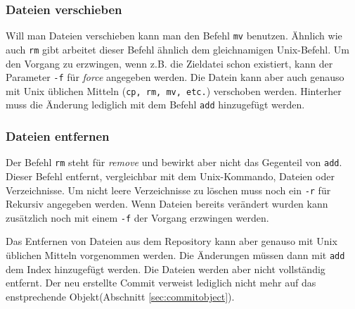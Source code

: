 \subsubsection{Dateien verschieben} Will man Dateien verschieben kann man den Befehl
\texttt{mv} benutzen. Ähnlich wie auch \texttt{rm} gibt arbeitet dieser Befehl
ähnlich dem gleichnamigen Unix-Befehl. Um den Vorgang zu erzwingen, wenn z.B.
die Zieldatei schon existiert, kann der Parameter \texttt{-f} für
\textit{force} angegeben werden.  Die Datein kann aber auch genauso mit Unix
üblichen Mitteln (\texttt{cp, rm, mv, etc.}) verschoben werden. Hinterher muss
die Änderung lediglich mit dem Befehl \texttt{add} hinzugefügt
werden.\cite[S.~43-44]{gitosp}



\subsubsection{Dateien entfernen}
Der Befehl \texttt{rm} steht für \textit{remove} und bewirkt aber nicht das
Gegenteil von \texttt{add}. Dieser Befehl entfernt, vergleichbar mit dem
Unix-Kommando, Dateien oder Verzeichnisse. Um nicht leere Verzeichnisse zu
löschen muss noch ein \texttt{-r} für Rekursiv angegeben werden. Wenn Dateien
bereits verändert wurden kann zusätzlich noch mit einem \texttt{-f} der Vorgang
erzwingen werden.



Das Entfernen von Dateien aus dem Repository kann aber genauso mit Unix
üblichen Mitteln vorgenommen werden. Die Änderungen müssen dann mit
\texttt{add} dem Index hinzugefügt werden. Die Dateien werden aber nicht
vollständig entfernt. Der neu erstellte Commit verweist lediglich nicht mehr
auf das enstprechende Objekt(Abschnitt
\ref{sec:commitobject}).\cite[S.~43-44]{gitosp}

